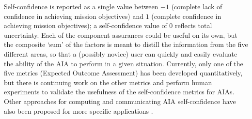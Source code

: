 Self-confidence is reported as a single value between $-1$ (complete lack of confidence in achieving mission objectives) and $1$ (complete confidence in achieving mission objectives); a self-confidence value of $0$ reflects total uncertainty. Each of the component assurances could be useful on its own, but the composite `sum' of the factors is meant to distill the information from the five different areas, so that a (possibly novice) user can quickly and easily evaluate the ability of the AIA to perform in a given situation. Currently, only one of the five metrics (Expected Outcome Assessment) has been developed quantitatively, but there is continuing work on the other metrics and perform human experiments to validate the usefulness of the self-confidence metrics for AIAs. Other approaches for computing and communicating AIA self-confidence have also been proposed for more specific applications \cite{Hutchins2015-if, Kaipa2015-hy, Zagorecki2015-qy, Kuter2015-qh}. 
